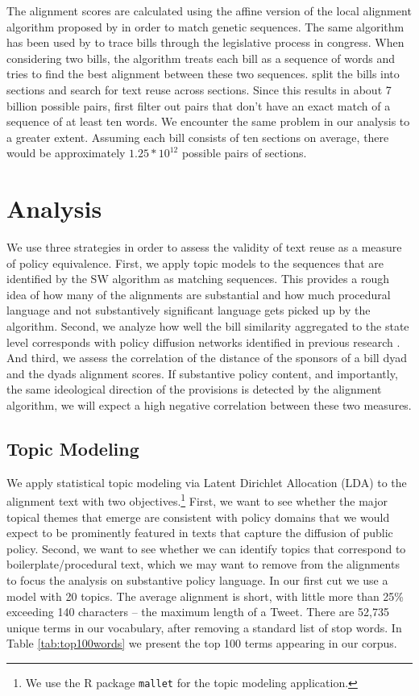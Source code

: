 \documentclass[12pt]{article} %
\begin{document}
The alignment scores are calculated using the affine version of the local alignment algorithm proposed by \citet{smith1981identification} in order to match genetic sequences. The same algorithm has been used by \citet{wilkerson2015tracing} to trace bills through the legislative process in congress. When considering two bills, the algorithm treats each bill as a sequence of words and tries to find the best alignment between these two sequences. \citet{wilkerson2015tracing} split the bills into sections and search for text reuse across sections. Since this results in about 7 billion possible pairs, first filter out pairs that don't have an exact match of a sequence of at least ten words. We encounter the same problem in our analysis to a greater extent. Assuming each bill consists of ten sections on average, there would be approximately $1.25 * 10^{12}$ possible pairs of sections. 



\section{Analysis}

We use three strategies in order to assess the validity of text reuse as a measure of policy equivalence. First, we apply topic models to the sequences that are identified by the SW algorithm as matching sequences. This provides a rough idea of how many of the alignments are substantial and how much procedural language and not substantively significant language gets picked up by the algorithm. Second, we analyze how well the bill similarity aggregated to the state level corresponds with policy diffusion networks identified in previous research \citep{desmarais2015}. And third, we assess the correlation of the distance of the sponsors of a bill dyad and the dyads alignment scores. If substantive policy content, and importantly, the same ideological direction of the provisions is detected by the alignment algorithm, we will expect a high negative correlation between these two measures.


\subsection{Topic Modeling}

We apply statistical topic modeling via Latent Dirichlet Allocation (LDA) \citep{blei2003} to the alignment text with two objectives.\footnote{We use the R package \texttt{mallet} \citep{mallet} for the topic modeling application.} First, we want to see whether the major topical themes that emerge are consistent with policy domains that we would expect to be prominently featured in texts that capture the diffusion of public policy. Second, we want to see whether we can identify topics that correspond to boilerplate/procedural text, which we may want to remove from the alignments to focus the analysis on substantive policy language. In our first cut we use a model with 20 topics. The average alignment is short, with little more than 25\% exceeding 140 characters -- the maximum length of a Tweet. There are 52,735 unique terms in our vocabulary, after removing a standard list of stop words. In Table \ref{tab:top100words} we present the top 100 terms appearing in our corpus. 
\end{document}
